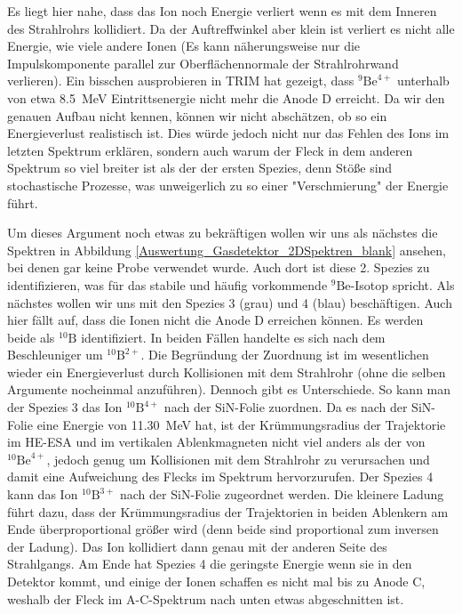 Es liegt hier nahe, dass das Ion noch Energie verliert wenn es mit dem Inneren des Strahlrohrs kollidiert.
Da der Auftreffwinkel aber klein ist verliert es nicht alle Energie, wie viele andere Ionen (Es kann näherungsweise nur die Impulskomponente parallel zur Oberflächennormale der Strahlrohrwand verlieren).
Ein bisschen ausprobieren in TRIM hat gezeigt, dass $^{9}\text{Be}^{4+}$ unterhalb von etwa \SI{8.5}{\mega\electronvolt} Eintrittsenergie nicht mehr die Anode D erreicht.
Da wir den genauen Aufbau nicht kennen, können wir nicht abschätzen, ob so ein Energieverlust realistisch ist.
Dies würde jedoch nicht nur das Fehlen des Ions im letzten Spektrum erklären, sondern auch warum der Fleck in dem anderen Spektrum so viel breiter ist als der der ersten Spezies, denn Stöße sind stochastische Prozesse, was unweigerlich zu so einer "Verschmierung" der Energie führt.

Um dieses Argument noch etwas zu bekräftigen wollen wir uns als nächstes die Spektren in Abbildung \ref{Auswertung_Gasdetektor_2DSpektren_blank} ansehen, bei denen gar keine Probe verwendet wurde.
Auch dort ist diese 2. Spezies zu identifizieren, was für das stabile und häufig vorkommende $^{9}\text{Be}$-Isotop spricht.
Als nächstes wollen wir uns mit den Spezies 3 (grau) und 4 (blau) beschäftigen.
Auch hier fällt auf, dass die Ionen nicht die Anode D erreichen können.
Es werden beide als $^{10}\text{B}$ identifiziert.
In beiden Fällen handelte es sich nach dem Beschleuniger um $^{10}\text{B}^{2+}$.
Die Begründung der Zuordnung ist im wesentlichen wieder ein Energieverlust durch Kollisionen mit dem Strahlrohr (ohne die selben Argumente nocheinmal anzuführen).
Dennoch gibt es Unterschiede.
So kann man der Spezies 3 das Ion $^{10}\text{B}^{4+}$ nach der SiN-Folie zuordnen.
Da es nach der SiN-Folie eine Energie von \SI{11.30}{\mega\electronvolt} hat, ist der Krümmungsradius der Trajektorie im HE-ESA und im vertikalen Ablenkmagneten nicht viel anders als der von $^{10}\text{Be}^{4+}$, jedoch genug um Kollisionen mit dem Strahlrohr zu verursachen und damit eine Aufweichung des Flecks im Spektrum hervorzurufen.
Der Spezies 4 kann das Ion $^{10}\text{B}^{3+}$ nach der SiN-Folie zugeordnet werden.
Die kleinere Ladung führt dazu, dass der Krümmungsradius der Trajektorien in beiden Ablenkern am Ende überproportional größer wird (denn beide sind proportional zum inversen der Ladung).
Das Ion kollidiert dann genau mit der anderen Seite des Strahlgangs.
Am Ende hat Spezies 4 die geringste Energie wenn sie in den Detektor kommt, und einige der Ionen schaffen es nicht mal bis zu Anode C, weshalb der Fleck im A-C-Spektrum nach unten etwas abgeschnitten ist.

